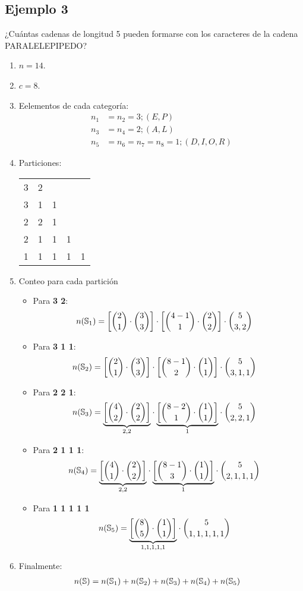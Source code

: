 \subsection*{Ejemplo 3}
¿Cuántas cadenas de longitud 5 pueden formarse con los caracteres de la cadena PARALELEPIPEDO?

\begin{enumerate}
\item $n=14$.
\item $c=8$.
\item Eelementos de cada categoría: 
\begin{align*}
	n_1&=n_2=3; (E, P)\\
	n_3&=n_4=2; (A, L)\\
	n_5&=n_6=n_7=n_8=1; (D, I, O,R)
	\end{align*}
\item Particiones:
\begin{table}[ht!]
	\centering
	\begin{tabular}{c c c c c}
		3 & 2\\
		3 & 1 & 1\\
		2 & 2 & 1\\
		2 & 1 & 1 & 1\\
		1 & 1 & 1 & 1 & 1
	\end{tabular}
\end{table}
\item Conteo para cada partición
\begin{itemize}
\item Para \textbf{3 2}:
\begin{align*}
n(\mathbb{S}_1)&=\left[\binom{2}{1}\cdot\binom{3}{3}\right]\cdot\left[\binom{4-1}{1}\cdot\binom{2}{2}\right]\cdot\binom{5}{3,2}
\end{align*}
\item Para \textbf{3 1 1}:
\begin{align*}
n(\mathbb{S}_2)&=\left[\binom{2}{1}\cdot\binom{3}{3}\right]\cdot\left[\binom{8-1}{2}\cdot\binom{1}{1}\right]\cdot\binom{5}{3,1,1}
\end{align*}
\item Para \textbf{2 2 1}:
\begin{align*}
n(\mathbb{S}_3)&=\underset{2, 2}{\underbrace{\left[\binom{4}{2}\cdot\binom{2}{2}\right]}}\cdot\underset{1}{\underbrace{\left[\binom{8-2}{1}\cdot\binom{1}{1}\right]}}\cdot\binom{5}{2,2,1}
\end{align*}
\item Para \textbf{2 1 1 1}:
\begin{align*}
n(\mathbb{S}_4)&=\underset{2, 2}{\underbrace{\left[\binom{4}{1}\cdot\binom{2}{2}\right]}}\cdot\underset{1}{\underbrace{\left[\binom{8-1}{3}\cdot\binom{1}{1}\right]}}\cdot\binom{5}{2,1,1,1}
\end{align*}
\item Para \textbf{1 1 1 1 1}
\begin{align*}
n(\mathbb{S}_5)&=\underset{1,1,1,1,1}{\underbrace{\left[\binom{8}{5}\cdot\binom{1}{1}\right]}}\cdot\binom{5}{1,1,1,1,1}
\end{align*}
\end{itemize}
\item Finalmente:
\begin{align*}
n(\mathbb{S})&=n(\mathbb{S}_1)+n(\mathbb{S}_2)+n(\mathbb{S}_3)+n(\mathbb{S}_4)+n(\mathbb{S}_5)
\end{align*}
\end{enumerate}